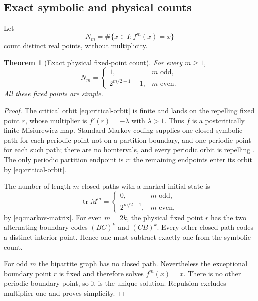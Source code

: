 \documentclass[11pt]{article}
\newtheorem{theorem}{Theorem}[section]
\theoremstyle{definition}
\theoremstyle{remark}
\newcommand{\tr}{\operatorname{tr}}
\begin{document}
\subsection{Exact symbolic and physical counts}

Let
\begin{equation}\label{eq:Nm-definition}
 N_m=\#\{x\in I:f^m(x)=x\}
\end{equation}
count distinct real points, without multiplicity.

\begin{theorem}[Exact physical fixed-point count]
\label{thm:exact-count}
For every $m\ge1$,
\begin{equation}\label{eq:exact-count}
 N_m=
 \begin{cases}
 1,&m\text{ odd},\\[0.2em]
 2^{m/2+1}-1,&m\text{ even}.
 \end{cases}
\end{equation}
All these fixed points are simple.
\end{theorem}

\begin{proof}
The critical orbit \eqref{eq:critical-orbit} is finite and lands on the
repelling fixed point $r$, whose multiplier is $f'(r)=-\lambda$ with
$\lambda>1$.  Thus $f$ is a postcritically finite Misiurewicz map.  Standard
Markov coding supplies one closed symbolic path for each periodic point not
on a partition boundary, and one periodic point for each such path; there are
no homtervals, and every periodic orbit is repelling
\citep{deMeloVanStrien1993,Baladi2000}.  The only periodic partition endpoint
is $r$: the remaining endpoints enter its orbit by
\eqref{eq:critical-orbit}.

The number of length-$m$ closed paths with a marked initial state is
\begin{equation}\label{eq:symbolic-count}
 \tr M^m=
 \begin{cases}
 0,&m\text{ odd},\\
 2^{m/2+1},&m\text{ even},
 \end{cases}
\end{equation}
by \eqref{eq:markov-matrix}.  For even $m=2k$, the physical fixed point $r$
has the two alternating boundary codes $(BC)^k$ and $(CB)^k$.  Every other
closed path codes a distinct interior point.  Hence one must subtract exactly
one from the symbolic count.

For odd $m$ the bipartite graph has no closed path.  Nevertheless the
exceptional boundary point $r$ is fixed and therefore solves $f^m(x)=x$.
There is no other periodic boundary point, so it is the unique solution.
Repulsion excludes multiplier one and proves simplicity.
\end{proof}
\end{document}
